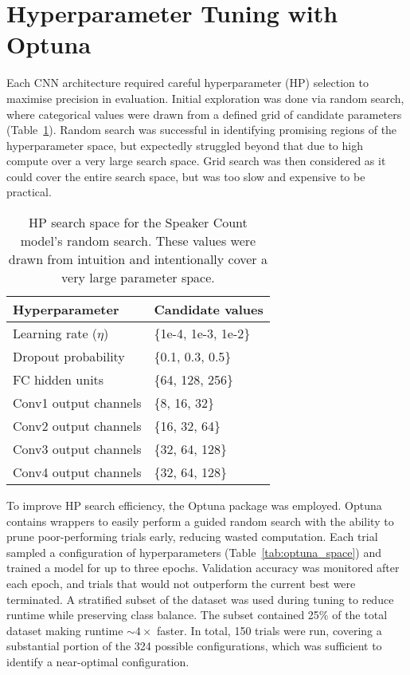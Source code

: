 \section{Hyperparameter Tuning with Optuna} 
Each CNN architecture required careful hyperparameter (HP) selection to maximise precision in evaluation. Initial exploration was done via random search, where categorical values were drawn from a defined grid of candidate parameters (Table~\ref{tab:hparam_space}). Random search was successful in identifying promising regions of the hyperparameter space, but expectedly struggled beyond that due to high compute over a very large search space. Grid search was then considered as it could cover the entire search space, but was too slow and expensive to be practical.


\begin{table}[H]
\centering
\caption{HP search space for the Speaker Count model's random search. These values were drawn from intuition and intentionally cover a very large parameter space.}
\begin{tabular}{ll}
\hline
Hyperparameter & Candidate values \\
\hline
Learning rate ($\eta$) & \{1e-4, 1e-3, 1e-2\} \\
Dropout probability & \{0.1, 0.3, 0.5\} \\
FC hidden units & \{64, 128, 256\} \\
Conv1 output channels & \{8, 16, 32\} \\
Conv2 output channels & \{16, 32, 64\} \\
Conv3 output channels & \{32, 64, 128\} \\
Conv4 output channels & \{32, 64, 128\} \\
\hline
\end{tabular}
\label{tab:hparam_space}
\end{table}

To improve HP search efficiency, the Optuna package \cite{optuna_2019} was employed. Optuna contains wrappers to easily perform a guided random search with the ability to prune poor-performing trials early, reducing wasted computation. Each trial sampled a configuration of hyperparameters (Table~\ref{tab:optuna_space}) and trained a model for up to three epochs. Validation accuracy was monitored after each epoch, and trials that would not outperform the current best were terminated. A stratified subset of the dataset was used during tuning to  reduce runtime while preserving class balance. The subset contained 25\% of the total dataset making runtime $\sim4\times$ faster. In total, 150 trials were run, covering a substantial portion of the 324 possible configurations, which was sufficient to identify a near-optimal configuration.  

